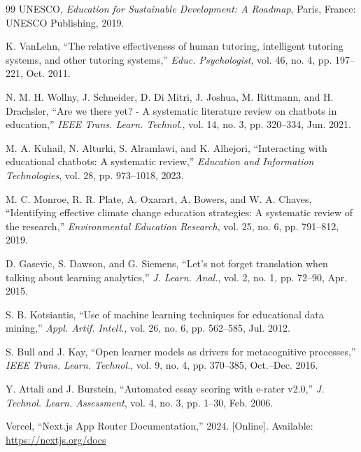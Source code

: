 \documentclass[12pt,a4paper,oneside]{report}
\begin{document}
    \begin{thebibliography}{99}
    UNESCO, \textit{Education for Sustainable Development: A Roadmap}, Paris, France: UNESCO Publishing, 2019.

    K. VanLehn, ``The relative effectiveness of human tutoring, intelligent tutoring systems, and other tutoring systems,'' \textit{Educ. Psychologist}, vol. 46, no. 4, pp. 197--221, Oct. 2011.

    N. M. H. Wollny, J. Schneider, D. Di Mitri, J. Joshua, M. Rittmann, and H. Drachsler, ``Are we there yet? - A systematic literature review on chatbots in education,'' \textit{IEEE Trans. Learn. Technol.}, vol. 14, no. 3, pp. 320--334, Jun. 2021.

    M. A. Kuhail, N. Alturki, S. Alramlawi, and K. Alhejori, ``Interacting with educational chatbots: A systematic review,'' \textit{Education and Information Technologies}, vol. 28, pp. 973--1018, 2023.

    M. C. Monroe, R. R. Plate, A. Oxarart, A. Bowers, and W. A. Chaves, ``Identifying effective climate change education strategies: A systematic review of the research,'' \textit{Environmental Education Research}, vol. 25, no. 6, pp. 791--812, 2019.

    D. Gasevic, S. Dawson, and G. Siemens, ``Let's not forget translation when talking about learning analytics,'' \textit{J. Learn. Anal.}, vol. 2, no. 1, pp. 72--90, Apr. 2015.

    S. B. Kotsiantis, ``Use of machine learning techniques for educational data mining,'' \textit{Appl. Artif. Intell.}, vol. 26, no. 6, pp. 562--585, Jul. 2012.

    S. Bull and J. Kay, ``Open learner models as drivers for metacognitive processes,'' \textit{IEEE Trans. Learn. Technol.}, vol. 9, no. 4, pp. 370--385, Oct.--Dec. 2016.

    Y. Attali and J. Burstein, ``Automated essay scoring with e-rater v2.0,'' \textit{J. Technol. Learn. Assessment}, vol. 4, no. 3, pp. 1--30, Feb. 2006.

    Vercel, ``Next.js App Router Documentation,'' 2024. [Online]. Available: \url{https://nextjs.org/docs}


\end{thebibliography}
\end{document}
